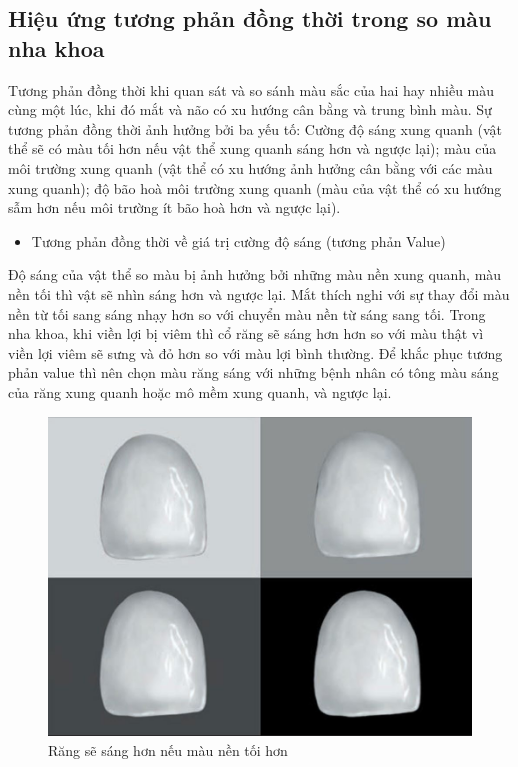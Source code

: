\subsection{Hiệu ứng tương phản đồng thời trong so màu nha khoa}
\vspace{-5pt}
\qquad Tương phản đồng thời khi quan sát và so sánh màu sắc của hai hay nhiều màu cùng một lúc, khi đó mắt và não có xu hướng cân bằng và trung bình màu. Sự tương phản đồng thời ảnh hưởng bởi ba yếu tố: Cường độ sáng xung quanh (vật thể sẽ có màu tối hơn nếu vật thể xung quanh sáng hơn và ngược lại); màu của môi trường xung quanh (vật thể có xu hướng ảnh hưởng cân bằng với các màu xung quanh); độ bão hoà môi trường xung quanh (màu của vật thể có xu hướng sẫm hơn nếu môi trường ít bão hoà hơn và ngược lại).
\vspace{-5pt}
\setlength{\parskip}{-1pt}
\begin{itemize}
    \item{Tương phản đồng thời về giá trị cường độ sáng (tương phản Value)}
\end{itemize}
\vspace{-5pt}
\qquad Độ sáng của vật thể so màu bị ảnh hưởng bởi những màu nền xung quanh, màu nền tối thì vật sẽ nhìn sáng hơn và ngược lại. Mắt thích nghi với sự thay đổi màu nền từ tối sang sáng nhạy hơn so với chuyển màu nền từ sáng sang tối. Trong nha khoa, khi viền lợi bị viêm thì cổ răng sẽ sáng hơn hơn so với màu thật vì viền lợi viêm sẽ sưng và đỏ hơn so với màu lợi bình thường. Để khắc phục tương phản value thì nên chọn màu răng sáng với những bệnh nhân có tông màu sáng của răng xung quanh hoặc mô mềm xung quanh, và ngược lại.\cite{TruongDinhKhoi}

\begin{figure}[h]
 \centering
    \includegraphics[width=0.8\columnwidth]{pictures/ảnh màu sắc răng trên nền sáng tối.jpeg}
    \caption{Răng sẽ sáng hơn nếu màu nền tối hơn}
    \label{fig:ảnh màu sắc răng trên nền sáng tối}
\end{figure}

